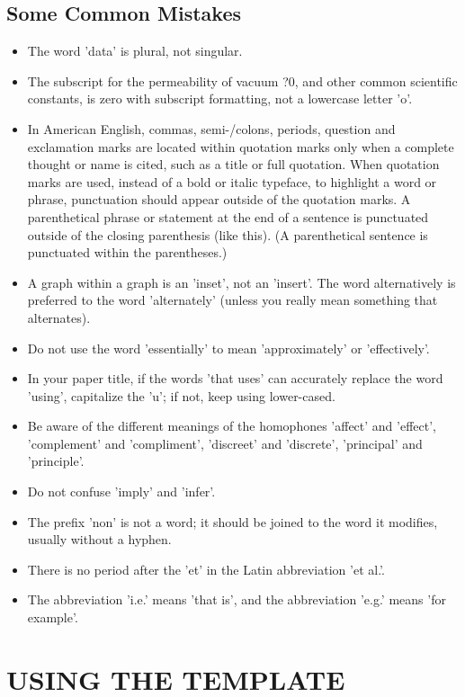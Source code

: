 \documentclass[letterpaper, 10 pt, conference]{ieeeconf}  %
\begin{document}
\subsection{Some Common Mistakes}
\begin{itemize}


\item The word 'data' is plural, not singular.
\item The subscript for the permeability of vacuum ?0, and other common scientific constants, is zero with subscript formatting, not a lowercase letter 'o'.
\item In American English, commas, semi-/colons, periods, question and exclamation marks are located within quotation marks only when a complete thought or name is cited, such as a title or full quotation. When quotation marks are used, instead of a bold or italic typeface, to highlight a word or phrase, punctuation should appear outside of the quotation marks. A parenthetical phrase or statement at the end of a sentence is punctuated outside of the closing parenthesis (like this). (A parenthetical sentence is punctuated within the parentheses.)
\item A graph within a graph is an 'inset', not an 'insert'. The word alternatively is preferred to the word 'alternately' (unless you really mean something that alternates).
\item Do not use the word 'essentially' to mean 'approximately' or 'effectively'.
\item In your paper title, if the words 'that uses' can accurately replace the word 'using', capitalize the 'u'; if not, keep using lower-cased.
\item Be aware of the different meanings of the homophones 'affect' and 'effect', 'complement' and 'compliment', 'discreet' and 'discrete', 'principal' and 'principle'.
\item Do not confuse 'imply' and 'infer'.
\item The prefix 'non' is not a word; it should be joined to the word it modifies, usually without a hyphen.
\item There is no period after the 'et' in the Latin abbreviation 'et al.'.
\item The abbreviation 'i.e.' means 'that is', and the abbreviation 'e.g.' means 'for example'.

\end{itemize}


\section{USING THE TEMPLATE}
\end{document}
